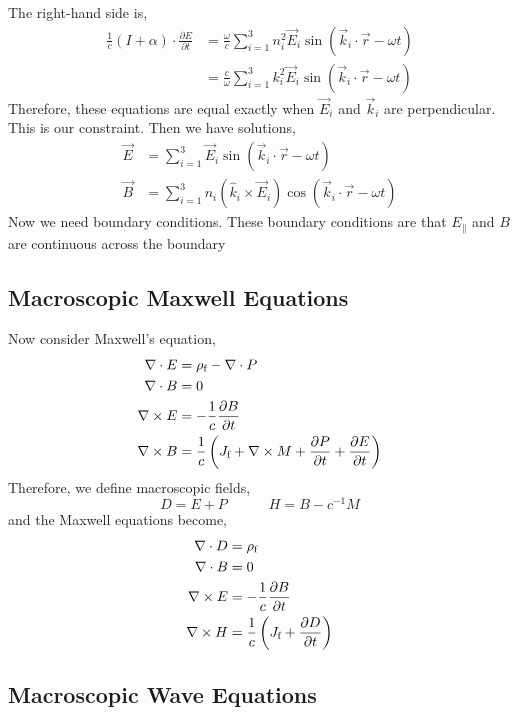 \documentclass[12pt]{extarticle}
\newcommand{\pderiv}[2]{\frac{\partial{#1}}{\partial{#2}}}
\theoremstyle{definition}
\begin{document}
The right-hand side is,
\begin{align*}
\frac{1}{c} (I + \alpha) \cdot \pderiv{E}{t} & = \frac{\omega}{c} \sum_{i = 1}^3 n_i^2  \vec{E}_i \sin{(\vec{k}_i \cdot \vec{r} - \omega t)} 
\\
& =  \frac{c}{\omega} \sum_{i = 1}^3 k_i^2 \vec{E}_i \sin{(\vec{k}_i \cdot \vec{r} - \omega t)} 
\end{align*}
Therefore, these equations are equal exactly when $\vec{E}_i$ and $\vec{k}_i$ are perpendicular. This is our constraint. Then we have solutions,
\begin{align*}
\vec{E} & = \sum_{i = 1}^3  \vec{E}_i \sin{(\vec{k}_i \cdot \vec{r} - \omega t)}
\\
\vec{B} & = \sum_{i = 1}^3 n_i (\hat{k}_i \times \vec{E}_i) \cos{(\vec{k}_i \cdot \vec{r} - \omega t)}
\end{align*}
Now we need boundary conditions. These boundary conditions are that $E_{\parallel}$ and $B$ are continuous across the boundary 

\subsection{Macroscopic Maxwell Equations}

Now consider Maxwell's equation,
\begin{align*}
\nabla \cdot E & = \rho_{\free} - \nabla \cdot P
\\
\nabla \cdot B & = 0
\\
\nabla \times E & = - \frac{1}{c} \pderiv{B}{t}
\\
\nabla \times B & = \frac{1}{c} \left( J_{\free} + \nabla \times M + \pderiv{P}{t} + \pderiv{E}{t} \right)
\end{align*}
Therefore, we define macroscopic fields,
\[ D = E + P \quad \quad \quad H = B - c^{-1} M \]
and the Maxwell equations become,
\begin{align*}
\nabla \cdot D & = \rho_{\free} 
\\
\nabla \cdot B & = 0
\\
\nabla \times E & = - \frac{1}{c} \pderiv{B}{t}
\\
\nabla \times H & = \frac{1}{c} \left( J_{\free} + \pderiv{D}{t} \right) 
\end{align*}

\subsection{Macroscopic Wave Equations}
\end{document}
